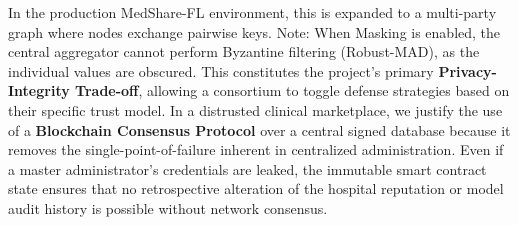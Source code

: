 \documentclass[10pt, a4paper, twocolumn]{article}
\begin{document}
In the production MedShare-FL environment, this is expanded to a multi-party graph where nodes exchange pairwise keys. Note: When Masking is enabled, the central aggregator cannot perform Byzantine filtering (Robust-MAD), as the individual values are obscured. This constitutes the project's primary \textbf{Privacy-Integrity Trade-off}, allowing a consortium to toggle defense strategies based on their specific trust model. In a distrusted clinical marketplace, we justify the use of a \textbf{Blockchain Consensus Protocol} over a central signed database because it removes the single-point-of-failure inherent in centralized administration. Even if a master administrator's credentials are leaked, the immutable smart contract state ensures that no retrospective alteration of the hospital reputation or model audit history is possible without network consensus.
\end{document}
